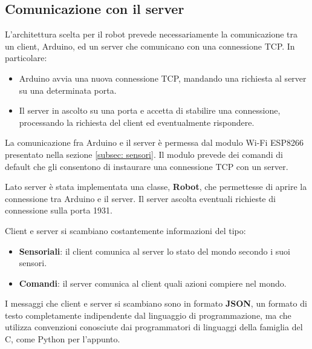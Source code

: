 \documentclass[a4paper,12pt,italian]{article}
\begin{document}
\subsection{Comunicazione con il server}

L'architettura scelta per il robot prevede necessariamente la comunicazione tra un client, Arduino, ed un server che comunicano con una connessione TCP. In particolare:
\begin{itemize}
	\item Arduino avvia una nuova connessione TCP, mandando una richiesta al server su una determinata porta.
	\item Il server in ascolto su una porta e accetta di stabilire una connessione, processando la richiesta del client ed eventualmente rispondere.
\end{itemize}

La comunicazione fra Arduino e il server è permessa dal modulo Wi-Fi ESP8266 presentato nella sezione \ref{subsec: sensori}. Il modulo prevede dei comandi di default che gli consentono di instaurare una connessione TCP con un server. 

Lato server è stata implementata una classe, \textbf{Robot}, che permettesse di aprire la connessione tra Arduino e il server. Il server ascolta eventuali richieste di connessione sulla porta 1931.

Client e server si scambiano costantemente informazioni del tipo:
\begin{itemize}
	\item \textbf{Sensoriali}: il client comunica al server lo stato del mondo secondo i suoi sensori.
	\item \textbf{Comandi}: il server comunica al client quali azioni compiere nel mondo.
\end{itemize}

I messaggi che client e server si scambiano sono in formato \textbf{JSON}, un formato di testo completamente indipendente dal linguaggio di programmazione, ma che utilizza convenzioni conosciute dai programmatori di linguaggi della famiglia del C, come Python per l'appunto.
\end{document}
